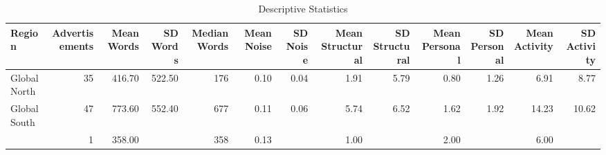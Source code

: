 \begin{table}[ht]
\centering
\begin{tabular}{lrrrrrrrrrrrr}
  \hline
Region & Advertisements & Mean Words & SD Words & Median Words & Mean Noise & SD Noise & Mean Structural & SD Structural & Mean Personal & SD Personal & Mean Activity & SD Activity \\ 
  \hline
Global North &  35 & 416.70 & 522.50 & 176 & 0.10 & 0.04 & 1.91 & 5.79 & 0.80 & 1.26 & 6.91 & 8.77 \\ 
  Global South &  47 & 773.60 & 552.40 & 677 & 0.11 & 0.06 & 5.74 & 6.52 & 1.62 & 1.92 & 14.23 & 10.62 \\ 
   &   1 & 358.00 &  & 358 & 0.13 &  & 1.00 &  & 2.00 &  & 6.00 &  \\ 
   \hline
\end{tabular}
\caption{Descriptive Statistics} 
\end{table}
